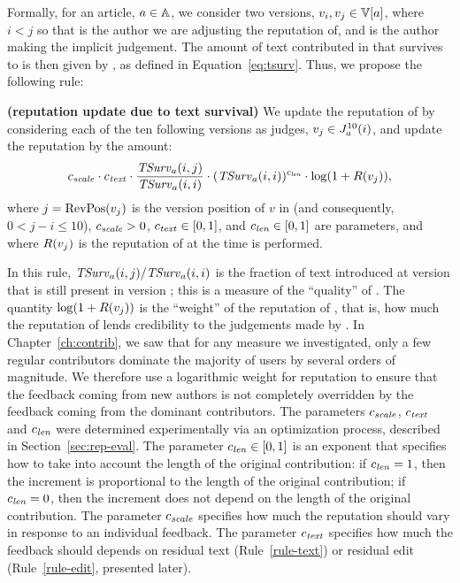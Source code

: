 Formally, for an article, $a \in \mathbb{A}$,
we consider two versions, $\version{i}, \version{j} \in \versions{a}$,
where $i < j$ so that  is the author we are
adjusting the reputation of, and  is the author
making the implicit judgement.
The amount of text contributed in  that survives
to  is then given by , as defined in
Equation~\ref{eq:tsurv}.
Thus, we propose the following rule:

\begin{regola}
\textbf{(reputation update due to text survival)}
\label{rule-text}
  We update the reputation of  by considering
  each of the ten following versions as judges,
  $v_j \in J_{a}^{10}(i)$, and update the reputation by the amount:
  \[
    {c_{{\text{\textit{scale}}}}} \cdot {c_{{\text{\textit{text}}}}} \cdot \frac{\mathit{TSurv}_{a}(i,j)}{\mathit{TSurv}_{a}(i,i)} 
    \cdot (\mathit{TSurv}_{a}(i,i))^{c_{{\text{\textit{len}}}}} \cdot \log(1 + R(v_{j})),
  \]
  where $j = \mathrm{RevPos}(v_{j})$ is the version position of $v$ in 
  (and consequently, $0 < j - i \le 10$),
  ${c_{{\text{\textit{scale}}}}} > 0$, ${c_{{\text{\textit{text}}}}} \in [0,1]$, and ${c_{{\text{\textit{len}}}}} \in
  [0,1]$ are parameters, and where $R(v_{j})$ is the reputation of
   at the time  is performed.
\end{regola}

\noindent
In this rule, $\mathit{TSurv}_{a}(i,j) / \mathit{TSurv}_{a}(i,i)$ is the fraction of text
introduced at version  that is still present in version ;
this is a measure of the ``quality'' of . 
The quantity $\log(1 + R(v_{j}))$ is the ``weight'' of the
reputation of ,
that is, how much the reputation of  lends
credibility to the judgements made by . 
In Chapter~\ref{ch:contrib}, we saw that for any measure we investigated,
only a few regular contributors dominate the majority of users by
several orders of magnitude.
We therefore use a logarithmic weight for reputation
to ensure that the feedback coming from new authors is not completely
overridden by the feedback coming from the dominant contributors. 
The parameters ${c_{{\text{\textit{scale}}}}}$, ${c_{{\text{\textit{text}}}}}$ and ${c_{{\text{\textit{len}}}}}$ were
determined experimentally via an optimization process, described
in Section~\ref{sec:rep-eval}.
The parameter ${c_{{\text{\textit{len}}}}} \in [0,1]$ is an exponent that specifies how
to take into account the length of the original contribution: if
${c_{{\text{\textit{len}}}}} = 1$, then the increment is proportional to the length of
the original contribution; if ${c_{{\text{\textit{len}}}}} = 0$, then the increment
does not depend on the length of the original contribution.
The parameter ${c_{{\text{\textit{scale}}}}}$ specifies how much the reputation should
vary in response to an individual feedback. 
The parameter ${c_{{\text{\textit{text}}}}}$ specifies how much the feedback should 
depends on residual text (Rule~\ref{rule-text}) or residual edit
(Rule~\ref{rule-edit}, presented later). 

